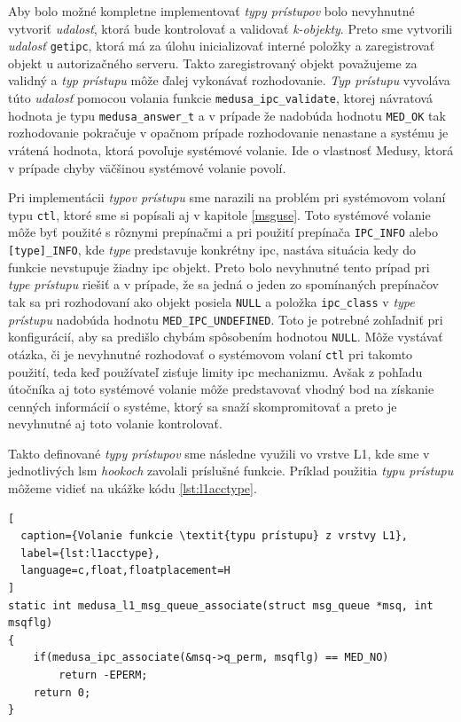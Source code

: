 Aby bolo možné kompletne implementovať \textit{typy prístupov} bolo nevyhnutné vytvoriť \textit{udalosť}, ktorá bude kontrolovať a validovať \textit{k-objekty}. Preto sme vytvorili \textit{udalosť} \texttt{getipc}, ktorá má za úlohu inicializovať interné položky a zaregistrovať objekt u autorizačného serveru. Takto zaregistrovaný objekt považujeme za validný a \textit{typ prístupu} môže ďalej vykonávať rozhodovanie. \textit{Typ prístupu} vyvoláva túto \textit{udalosť} pomocou volania funkcie \texttt{medusa\_ipc\_validate}, ktorej návratová hodnota je typu \texttt{medusa\_answer\_t} a v prípade že nadobúda hodnotu \texttt{MED\_OK} tak rozhodovanie pokračuje v opačnom prípade rozhodovanie nenastane a systému je vrátená hodnota, ktorá povoľuje systémové volanie. Ide o vlastnosť Medusy, ktorá v prípade chyby väčšinou systémové volanie povolí.

Pri implementácii \textit{typov prístupu} sme narazili na problém pri systémovom volaní typu \texttt{ctl}, ktoré sme si popísali aj v kapitole \ref{msguse}. Toto systémové volanie môže byť použité s rôznymi prepínačmi a pri použití prepínača \texttt{IPC\_INFO} alebo \texttt{[type]\_INFO}, kde \textit{type} predstavuje konkrétny \acrshort{ipc}, nastáva situácia kedy do funkcie nevstupuje žiadny \acrshort{ipc} objekt. Preto bolo nevyhnutné tento prípad pri \textit{type prístupu} riešiť a v prípade, že sa jedná o jeden zo spomínaných prepínačov tak sa pri rozhodovaní ako objekt posiela \texttt{NULL} a položka \texttt{ipc\_class} v \textit{type prístupu} nadobúda hodnotu \texttt{MED\_IPC\_UNDEFINED}. Toto je potrebné zohľadniť pri konfigurácií, aby sa predišlo chybám spôsobením hodnotou \texttt{NULL}. Môže vystávať otázka, či je nevyhnutné rozhodovať o systémovom volaní \texttt{ctl} pri takomto použití, teda keď používateľ zisťuje limity \acrshort{ipc} mechanizmu. Avšak z pohľadu útočníka aj toto systémové volanie môže predstavovať vhodný bod na získanie cenných informácií o systéme, ktorý sa snaží skompromitovať a preto je nevyhnutné aj toto volanie kontrolovať.

Takto definované \textit{typy prístupov} sme následne využili vo vrstve L1, kde sme v jednotlivých \acrshort{lsm} \textit{hookoch} zavolali príslušné funkcie. Príklad použitia \textit{typu prístupu} môžeme vidieť na ukážke kódu \ref{lst:l1acctype}.
\begin{lstlisting}[
  caption={Volanie funkcie \textit{typu prístupu} z vrstvy L1},
  label={lst:l1acctype},
  language=c,float,floatplacement=H
]
static int medusa_l1_msg_queue_associate(struct msg_queue *msq, int msqflg)
{
	if(medusa_ipc_associate(&msq->q_perm, msqflg) == MED_NO)
		return -EPERM;	
	return 0;
}
\end{lstlisting}

